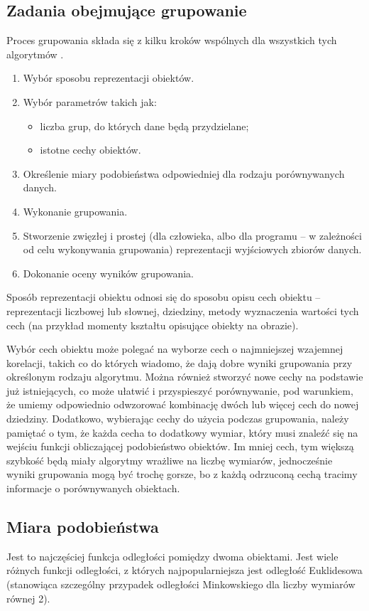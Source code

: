 \documentclass{article}
\begin{document}
\subsection{Zadania obejmujące grupowanie}
Proces grupowania składa się z kilku kroków wspólnych dla wszystkich tych algorytmów \cite{jain_clustering}.
\begin{enumerate}
	\item Wybór sposobu reprezentacji obiektów.
	\item Wybór parametrów takich jak:
	\begin{itemize}
		\item liczba grup, do których dane będą przydzielane;
		\item istotne cechy obiektów.
	\end{itemize}
	\item Określenie miary podobieństwa odpowiedniej dla rodzaju porównywanych danych.
	\item Wykonanie grupowania.
	\item Stworzenie zwięzłej i prostej (dla człowieka, albo dla programu – w zależności od celu wykonywania grupowania) reprezentacji wyjściowych zbiorów danych.
	\item Dokonanie oceny wyników grupowania.
\end{enumerate}

Sposób reprezentacji obiektu odnosi się do sposobu opisu cech obiektu – reprezentacji liczbowej lub słownej, dziedziny, metody wyznaczenia wartości tych cech (na przykład momenty kształtu opisujące obiekty na obrazie).

Wybór cech obiektu może polegać na wyborze cech o najmniejszej wzajemnej korelacji, takich co do których wiadomo, że dają dobre wyniki grupowania przy określonym rodzaju algorytmu. Można również stworzyć nowe cechy na podstawie już istniejących, co może ułatwić i przyspieszyć porównywanie, pod warunkiem, że umiemy odpowiednio odwzorować kombinację dwóch lub więcej cech do nowej dziedziny. Dodatkowo, wybierając cechy do użycia podczas  grupowania, należy pamiętać o tym, że każda cecha to dodatkowy wymiar, który musi znaleźć się na wejściu funkcji obliczającej podobieństwo obiektów. Im mniej cech, tym większą szybkość będą miały algorytmy wrażliwe na liczbę wymiarów, jednocześnie wyniki grupowania mogą być trochę gorsze, bo z każdą odrzuconą cechą tracimy informacje o porównywanych obiektach.


\subsection{Miara podobieństwa}
Jest to najczęściej funkcja odległości pomiędzy dwoma obiektami. Jest wiele różnych funkcji odległości, z których najpopularniejsza jest odległość Euklidesowa (stanowiąca szczególny przypadek odległości Minkowskiego dla liczby wymiarów równej 2).
\end{document}
